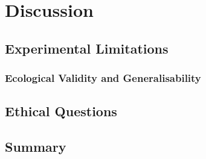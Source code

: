 \chapter{Discussion} \label{chap:maindisc}
\section{Experimental Limitations} \label{sec:disc-limitations}

\subsection{Ecological Validity and Generalisability} \label{sec:disc-experiments}

\section{Ethical Questions} \label{sec:ch10-ethics}

\section{Summary} \label{sec:maindisc-summary}
